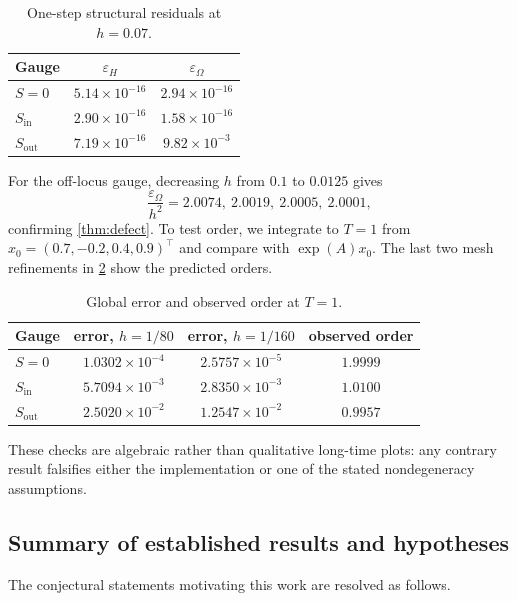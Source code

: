 \documentclass[11pt,a4paper]{article}
\begin{document}
\begin{table}[htbp]
\centering
\caption{One-step structural residuals at \(h=0.07\).}
\label{tab:residuals}
\begin{tabular}{@{}lcc@{}}
\toprule
Gauge & \(\varepsilon_H\) & \(\varepsilon_\Omega\) \\ \midrule
\(S=0\) & \(5.14\times10^{-16}\) & \(2.94\times10^{-16}\) \\
\(S_{\mathrm{in}}\) & \(2.90\times10^{-16}\) & \(1.58\times10^{-16}\) \\
\(S_{\mathrm{out}}\) & \(7.19\times10^{-16}\) & \(9.82\times10^{-3}\) \\
\bottomrule
\end{tabular}
\end{table}

For the off-locus gauge, decreasing \(h\) from \(0.1\) to \(0.0125\)
gives
\[
 \frac{\varepsilon_\Omega}{h^2}
 =2.0074,\ 2.0019,\ 2.0005,\ 2.0001,
\]
confirming \cref{thm:defect}. To test order, we integrate to \(T=1\) from
\(x_0=(0.7,-0.2,0.4,0.9)^\top\) and compare with
\(\exp(A)x_0\). The last two mesh refinements in
\cref{tab:order} show the predicted orders.

\begin{table}[htbp]
\centering
\caption{Global error and observed order at \(T=1\).}
\label{tab:order}
\begin{tabular}{@{}lccc@{}}
\toprule
Gauge & error, \(h=1/80\) & error, \(h=1/160\) & observed order \\ \midrule
\(S=0\) & \(1.0302\times10^{-4}\) & \(2.5757\times10^{-5}\) & \(1.9999\) \\
\(S_{\mathrm{in}}\) & \(5.7094\times10^{-3}\) & \(2.8350\times10^{-3}\) & \(1.0100\) \\
\(S_{\mathrm{out}}\) & \(2.5020\times10^{-2}\) & \(1.2547\times10^{-2}\) & \(0.9957\) \\
\bottomrule
\end{tabular}
\end{table}

These checks are algebraic rather than qualitative long-time plots: any
contrary result falsifies either the implementation or one of the stated
nondegeneracy assumptions.

\subsection{Summary of established results and hypotheses}

The conjectural statements motivating this work are resolved as follows.
\end{document}
